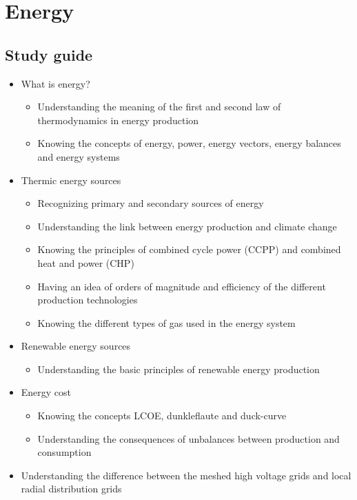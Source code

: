 \documentclass[../summary.tex]{subfiles}
\begin{document}
	
	\section{Energy}
	
	\subsection{Study guide}
	\begin{itemize} 
		\setlength{\itemsep}{0pt}
		\item What is energy?
		\begin{itemize}
			\item Understanding the meaning of the first and second law of thermodynamics in energy production
			\item Knowing the concepts of energy, power, energy vectors, energy balances and energy systems
		\end{itemize}
		\item Thermic energy sources
		\begin{itemize}
			\item Recognizing primary and secondary sources of energy
			\item Understanding the link between energy production and climate change
			\item Knowing the principles of combined cycle power (CCPP) and combined heat and power (CHP)
			\item Having an idea of orders of magnitude and efficiency of the different production technologies
			\item Knowing the different types of gas used in the energy system
		\end{itemize}
		\item Renewable energy sources
		\begin{itemize}
			\item Understanding the basic principles of renewable energy production
		\end{itemize}
		\item Energy cost
		\begin{itemize}
			\item Knowing the concepts LCOE, dunkleflaute and duck-curve
			\item Understanding the consequences of unbalances between production and consumption
		\end{itemize}
		\item Understanding the difference between the meshed high voltage grids and local radial distribution grids

\end{itemize}
\end{document}
